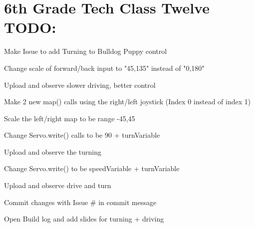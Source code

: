 \documentclass{article}
\begin{document}
\section{6th Grade Tech Class Twelve TODO:}
\begin{todolist}
	\item Make Issue to add Turning to Bulldog Puppy control
	\item Change scale of forward/back input to "45,135" instead of "0,180"
	\item Upload and observe slower driving, better control
	\item Make 2 new map() calls using the right/left joystick (Index 0 instead of index 1)
	\item Scale the left/right map to be range -45,45
	\item Change Servo.write() calls to be 90 + turnVariable
	\item Upload and observe the turning
	\item Change Servo.write() to be speedVariable + turnVariable
	\item Upload and observe drive and turn
	\item Commit changes with Issue \# in commit message
	\item Open Build log and add slides for turning + driving
\end{todolist}
\end{document}
